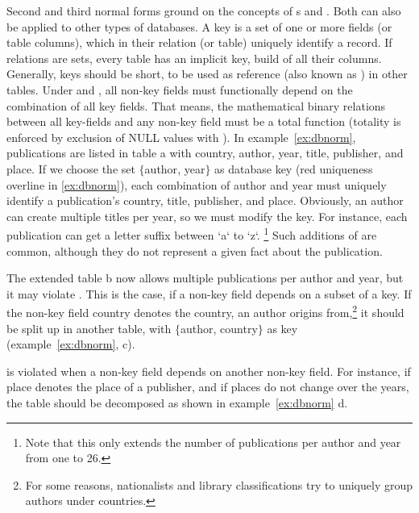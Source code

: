 Second and third normal forms ground on the concepts
of s and .
Both can also be applied to other types of databases. A key is a set of
one or more fields (or table columns), which in their relation (or table) uniquely
identify a record. If relations are sets, every table has an implicit key, build 
of all their columns. Generally, keys should be short, to be used as reference
(also known as ) in other tables. Under  and 
, all non-key fields must functionally depend on the combination of all
key fields. That means, the mathematical binary relations between all key-fields 
and any non-key field must be a total function (totality is enforced by exclusion
of NULL values with ). In example~\ref{ex:dbnorm}, publications are
listed in table {\ormtext a} with country, author, year, title, publisher,
and place. If we choose the set $\{${\ormtext author}, {\ormtext year}$\}$ as
database key (red uniqueness overline in \ref{ex:dbnorm}), each combination 
of author and year must uniquely identify a 
publication's country, title, publisher, and place. Obviously, an author can 
create multiple titles per year, so we must modify the key. For instance, each
publication can get a {\ormtext letter} suffix between `a` to `z`.%
\footnote{Note that this only extends the number of publications per author 
and year from one to 26.} Such additions of
 are common,
although they do not represent a given fact about the publication.

The extended table {\ormtext b} now allows multiple publications per author
and year, but it may violate . This is the case, if a non-key field
depends on a subset of a key. If the non-key field {\ormtext country}
denotes the country, an author origins from,\footnote{For some reasons, 
nationalists and library classifications try to uniquely group authors under
countries.} it should  be split up in another table, with $\{${\ormtext author}, 
{\ormtext country}$\}$ as key (example~\ref{ex:dbnorm}, {\ormtext c}).

 is violated when a non-key field depends on another non-key field. 
For instance, if {\ormtext place} denotes the place of a publisher, and if places
do not change over the years, the table should be decomposed as shown in 
example~\ref{ex:dbnorm} {\ormtext d}.

